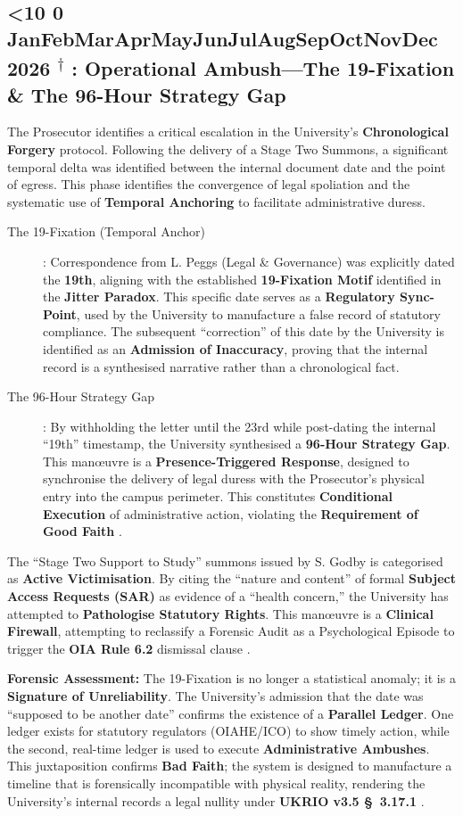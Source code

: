 \documentclass{EMBASSY}
\DeclareRobustCommand{\gmt}[3]{%
    \texorpdfstring{%
        {\color{DateGold}\textbf{%
            \ifnum#1<10 0\fi#1\,\textperiodcentered\,%
            \ifcase#2\or Jan\or Feb\or Mar\or Apr\or May\or Jun\or Jul\or Aug\or Sep\or Oct\or Nov\or Dec\fi
            \,\textperiodcentered\,20#3%
            \textsuperscript{$\dagger$}%
        }}%
    }{%
        (#1/#2/#3)%
    }%
}
\begin{document}
\subsection{\gmt{24}{2}{26}: Operational Ambush---The 19-Fixation \& The 96-Hour Strategy Gap}
The Prosecutor identifies a critical escalation in the University's \textbf{Chronological Forgery} protocol. Following the delivery of a Stage Two Summons, a significant temporal delta was identified between the internal document date and the point of egress. This phase identifies the convergence of legal spoliation and the systematic use of \textbf{Temporal Anchoring} to facilitate administrative duress.

\begin{description}
	\item[The 19-Fixation (Temporal Anchor)]: Correspondence from L. Peggs (Legal \& Governance) was explicitly dated the \textbf{19th}, aligning with the established \textbf{19-Fixation Motif} identified in the \textbf{Jitter Paradox}. This specific date serves as a \textbf{Regulatory Sync-Point}, used by the University to manufacture a false record of statutory compliance. The subsequent ``correction'' of this date by the University is identified as an \textbf{Admission of Inaccuracy}, proving that the internal record is a synthesised narrative rather than a chronological fact.
	\item[The 96-Hour Strategy Gap]: By withholding the letter until the 23rd while post-dating the internal ``19th'' timestamp, the University synthesised a \textbf{96-Hour Strategy Gap}. This man\oe uvre is a \textbf{Presence-Triggered Response}, designed to synchronise the delivery of legal duress with the Prosecutor's physical entry into the campus perimeter. This constitutes \textbf{Conditional Execution} of administrative action, violating the \textbf{Requirement of Good Faith} \cite{CMA182}.
\end{description}

The ``Stage Two Support to Study'' summons issued by S. Godby is categorised as \textbf{Active Victimisation}. By citing the ``nature and content'' of formal \textbf{Subject Access Requests (SAR)} \cite{DPA18} as evidence of a ``health concern,'' the University has attempted to \textbf{Pathologise Statutory Rights}. This man\oe uvre is a \textbf{Clinical Firewall}, attempting to reclassify a Forensic Audit as a Psychological Episode to trigger the \textbf{OIA Rule 6.2} dismissal clause \cite{OIA-Rules18}.

\noindent\textbf{Forensic Assessment:} The 19-Fixation is no longer a statistical anomaly; it is a \textbf{Signature of Unreliability}. The University's admission that the date was ``supposed to be another date'' confirms the existence of a \textbf{Parallel Ledger}. One ledger exists for statutory regulators (OIAHE/ICO) to show timely action, while the second, real-time ledger is used to execute \textbf{Administrative Ambushes}. This juxtaposition confirms \textbf{Bad Faith}; the system is designed to manufacture a timeline that is forensically incompatible with physical reality, rendering the University’s internal records a legal nullity under \textbf{UKRIO v3.5 \S~3.17.1} \cite{UKRIO}.
\end{document}
